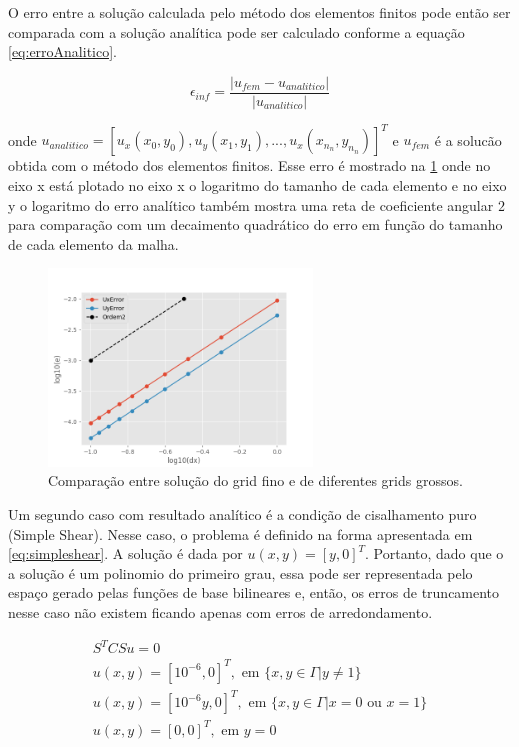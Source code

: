 O erro entre a solução calculada pelo método dos elementos finitos pode então ser comparada
com a solução analítica pode ser calculado conforme a equação \ref{eq:erroAnalitico}.

\begin{equation} \label{eq:erroAnalitico}
    \epsilon_{inf} =\frac{|u_{fem} - u_{analitico}|}{|u_{analitico}|}
\end{equation}

onde $u_{analitico} = [u_x(x_0, y_0), u_y(x_1, y_1), ..., u_x(x_{n_n}, y_{n_n})]^T$ e $u_{fem}$ é a solucão obtida com o método dos elementos finitos. Esse erro é mostrado na \ref{fig:SecondOrderTest} onde no eixo x 
está plotado no eixo x o logaritmo do tamanho de cada elemento e no eixo y o logaritmo do erro analítico também mostra uma reta de coeficiente angular $2$ para comparação com um decaimento
quadrático do erro em função do tamanho de cada elemento da malha.

\begin{figure}[!htbp]
    \caption{Comparação entre solução do grid fino e de diferentes grids grossos.}
    \label{fig:SecondOrderTest}
    \centering
    \includegraphics[width=7cm]{chap08/figs/SecondErrorTest.png}
\end{figure}
    
Um segundo caso com resultado analítico é a condição de cisalhamento puro (Simple Shear). 
Nesse caso, o problema é definido na forma apresentada em \ref{eq:simpleshear}. A solução
é dada por $u(x,y) = [y, 0]^T$. Portanto, dado que o a solução é um polinomio do primeiro grau,
essa pode ser representada pelo espaço gerado pelas funções de base bilineares e, então,
os erros de truncamento nesse caso não existem ficando apenas com erros de arredondamento.

\begin{equation}\label{eq:simpleshear}
    \begin{aligned}
        S^T C S u = 0 \\
        u(x,y) = [10^{-6}, 0]^T, \text{ em } \{x, y \in \Gamma | y \neq 1\} \\
        u(x,y) = [10^{-6}y, 0]^T, \text{ em } \{x, y \in \Gamma | x = 0 \text{ ou } x = 1\} \\
        u(x,y) = [0, 0]^T, \text{ em } y=0
    \end{aligned}
\end{equation}

